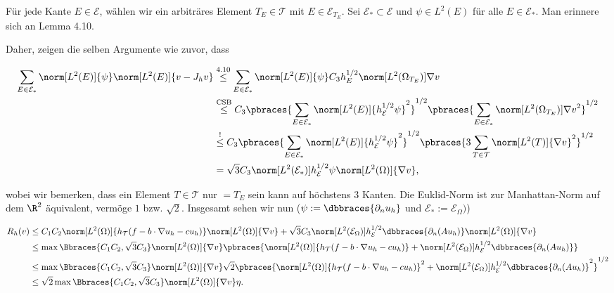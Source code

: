 \begin{solution}
\begin{enumerate}[label = \textbf{\alph*)}]
  Für jede Kante $E \in \mathcal{E}$, wählen wir ein arbiträres Element $T_E \in \mathcal{T}$ mit $E \in \mathcal{E}_{T_E}$.
  Sei $\mathcal{E}_\ast \subset \mathcal{E}$ und $\psi \in L^2(E)$ für alle $E \in \mathcal{E}_\ast$.
  Man erinnere sich an Lemma 4.10.


  Daher, zeigen die selben Argumente wie zuvor, dass

  \begin{align*}
    \sum_{E \in \mathcal{E}_\ast}
    \norm[L^2(E)]{\psi}
    \norm[L^2(E)]{v - J_h v}
    & \stackrel
    {
      \mathrm{4.10}
    }{\leq}
    \sum_{E \in \mathcal{E}_\ast}
    \norm[L^2(E)]{\psi}
    C_3 h_E^{1/2}
    \norm[L^2(\Omega_{T_E})]{\nabla v} \\
    & \stackrel
    {
      \mathrm{CSB}
    }{\leq}
    C_3
    \pbraces
    {
      \sum_{E \in \mathcal{E}_\ast}
      \norm[L^2(E)]{h_\mathcal{E}^{1/2} \psi}^2
    }^{1/2}
    \pbraces
    {
      \sum_{E \in \mathcal{E}_\ast}
      \norm[L^2(\Omega_{T_E})]{\nabla v}^2
    }^{1/2} \\
    & \stackrel{!}{\leq}
    C_3
    \pbraces
    {
      \sum_{E \in \mathcal{E}_\ast}
      \norm[L^2(E)]{h_\mathcal{E}^{1/2} \psi}^2
    }^{1/2}
    \pbraces
    {
      3
      \sum_{T \in \mathcal{T}}
      \norm[L^2(T)]{\nabla v}^2
    }^{1/2} \\
    & =
    \sqrt{3} C_3
    \norm[L^2(\mathcal{E}_\ast)]{h_\mathcal{E}^{1/2} \psi}
    \norm[L^2(\Omega)]{\nabla v},
  \end{align*}

  wobei wir bemerken, dass ein Element $T \in \mathcal{T}$ nur $= T_E$ sein kann auf höchstens $3$ Kanten.
  Die Euklid-Norm ist zur Manhattan-Norm auf dem $\R^2$ äquivalent, vermöge $1$ bzw. $\sqrt{2}$.
  Insgesamt sehen wir nun ($\psi := \dbbraces{\partial_n u_h}$ und $\mathcal{E}_\ast := \mathcal{E}_\Omega)$)

  \begin{align*}
    R_h(v)
    & \leq
    C_1 C_2
    \norm[L^2(\Omega)]{h_\mathcal{T} (f - b \cdot \nabla u_h - c u_h)}
    \norm[L^2(\Omega)]{\nabla v}
    +
    \sqrt{3} C_3
    \norm[L^2(\mathcal{E}_\Omega)]{h_\mathcal{E}^{1/2} \dbbraces{\partial_n(A u_h)}}
    \norm[L^2(\Omega)]{\nabla v} \\
    & \leq
    \max \Bbraces{C_1 C_2, \sqrt{3} C_3}
    \norm[L^2(\Omega)]{\nabla v}
    \pbraces
    {
      \norm[L^2(\Omega)]{h_\mathcal{T} (f - b \cdot \nabla u_h - c u_h)}
      +
      \norm[L^2(\mathcal{E}_\Omega)]{h_\mathcal{E}^{1/2} \dbbraces{\partial_n (A u_h)}}
    } \\
    & \leq
    \max \Bbraces{C_1 C_2, \sqrt{3} C_3}
    \norm[L^2(\Omega)]{\nabla v}
    \sqrt{2}
    \pbraces
    {
      \norm[L^2(\Omega)]{h_\mathcal{T} (f - b \cdot \nabla u_h - c u_h)}^2
      +
      \norm[L^2(\mathcal{E}_\Omega)]{h_\mathcal{E}^{1/2} \dbbraces{\partial_n (A u_h)}}^2
    }^{1/2} \\
    & \leq
    \sqrt{2}
    \max \Bbraces{C_1 C_2, \sqrt{3} C_3}
    \norm[L^2(\Omega)]{\nabla v}
    \eta.
  \end{align*}


\end{enumerate}
\end{solution}

